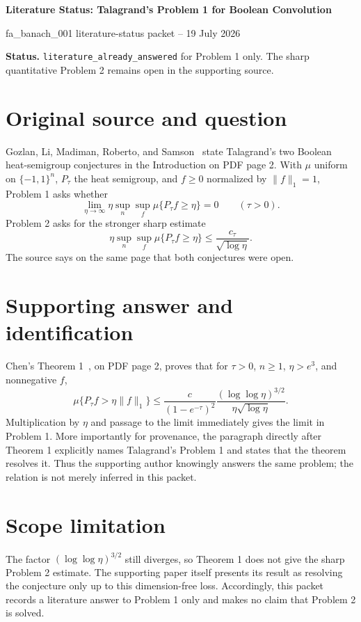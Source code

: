 \documentclass[10pt]{article}
\begin{document}
\begin{center}
{\Large\bfseries Literature Status: Talagrand's Problem 1 for Boolean Convolution}\par
\smallskip
{\small fa\_banach\_001 literature-status packet -- 19 July 2026}
\end{center}

\textbf{Status.} \texttt{literature\_already\_answered} for Problem 1 only.
The sharp quantitative Problem 2 remains open in the supporting source.

\section*{Original source and question}

Gozlan, Li, Madiman, Roberto, and Samson~\cite{GLMRS} state Talagrand's two
Boolean heat-semigroup conjectures in the Introduction on PDF page 2.  With
\(\mu\) uniform on \(\{-1,1\}^n\), \(P_\tau\) the heat semigroup, and
\(f\geq0\) normalized by \(\lVert f\rVert_1=1\), Problem 1 asks whether
\[
 \lim_{\eta\to\infty}
 \eta\sup_n\sup_f \mu\{P_\tau f\geq\eta\}=0
 \qquad(\tau>0).
\]
Problem 2 asks for the stronger sharp estimate
\[
 \eta\sup_n\sup_f \mu\{P_\tau f\geq\eta\}
 \leq \frac{c_\tau}{\sqrt{\log\eta}}.
\]
The source says on the same page that both conjectures were open.

\section*{Supporting answer and identification}

Chen's Theorem 1~\cite{Chen}, on PDF page 2, proves that for
\(\tau>0\), \(n\geq1\), \(\eta>e^3\), and nonnegative \(f\),
\[
 \mu\{P_\tau f>\eta\lVert f\rVert_1\}
 \leq
 \frac{c}{(1-e^{-\tau})^2}
 \frac{(\log\log\eta)^{3/2}}{\eta\sqrt{\log\eta}}.
\]
Multiplication by \(\eta\) and passage to the limit immediately gives the
limit in Problem 1.  More importantly for provenance, the paragraph directly
after Theorem 1 explicitly names Talagrand's Problem 1 and states that the
theorem resolves it.  Thus the supporting author knowingly answers the same
problem; the relation is not merely inferred in this packet.

\section*{Scope limitation}

The factor \((\log\log\eta)^{3/2}\) still diverges, so Theorem 1 does not give
the sharp Problem 2 estimate.  The supporting paper itself presents its result
as resolving the conjecture only up to this dimension-free loss.  Accordingly,
this packet records a literature answer to Problem 1 only and makes no claim
that Problem 2 is solved.
\end{document}

